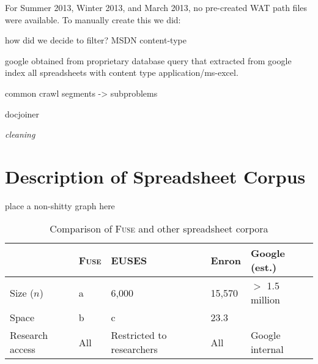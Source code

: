 \documentclass[conference]{IEEEtran}
\begin{document}
For Summer 2013, Winter 2013, and March 2013, no pre-created WAT path files were available. To manually create this we did:




how did we decide to filter? MSDN content-type


google obtained from proprietary database query that extracted from google index all spreadsheets with content type application/ms-excel.

common crawl
segments -> subproblems

docjoiner

\emph{cleaning}

\section{Description of Spreadsheet Corpus}



place a non-shitty graph here

\begin{table}[!t]
\caption{Comparison of \textsc{Fuse} and other spreadsheet corpora\label{tab:corpora}}
\centering
\begin{tabular}{lllll}
\toprule
& \textbf{\textsc{Fuse}} & \textbf{EUSES} & \textbf{Enron} & \textbf{Google (est.)}\\
\midrule
Size ($n$) & a & 6,000 & 15,570 & $>$ 1.5 million \\
Space & b & c & 23.3\\
Research access & All & Restricted to researchers & All & Google internal\\
\bottomrule
\end{tabular}
\end{table}
\end{document}
